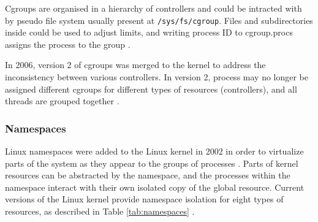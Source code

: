 Cgroups are organised in a hierarchy of controllers and could be intracted with by pseudo file system usually present at \texttt{/sys/fs/cgroup}. Files and subdirectories inside could be used to adjust limits, and writing process ID to cgroup.procs assigns the process to the group \cite{book:rice}.

In 2006, version 2 of cgroups was merged to the kernel to address the inconsistency between various controllers. In version 2, process may no longer be assigned different cgroups for different types of resources (controllers), and all threads are grouped together \cite{m:cgroups}.

\subsubsection{Namespaces}

Linux namespaces were added to the Linux kernel in 2002 in order to virtualize parts of the system as they appear to the groups of processes \cite{m:namespaces}. Parts of kernel resources can be abstracted by the namespace, and the processes within the namespace interact with their own isolated copy of the global resource. Current versions of the Linux kernel provide namespace isolation for eight types of resources, as described in Table \ref{tab:namespaces} \cite{s:namespaces}.


